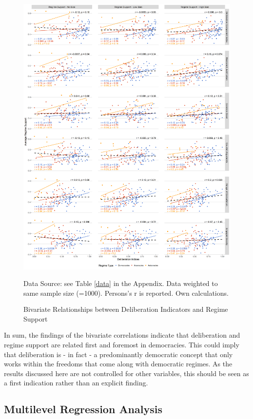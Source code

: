 \documentclass[]{article}
\begin{document}
\begin{figure}
        \caption{Bivariate Relationships between Deliberation Indicators and Regime Support}
        \label{sixs}
    \includegraphics[width=\textwidth]{images/megaplot.png}
        \flushright
        {\scriptsize Data Source: see Table \ref{data} in the Appendix. Data weighted to same sample size (=1000). Persons’s r is reported. Own calculations.  \par}
\end{figure}

In sum, the findings of the bivariate correlations indicate that
deliberation and regime support are related first and foremost in
democracies. This could imply that deliberation is - in fact - a
predominantly democratic concept that only works within the freedoms
that come along with democratic regimes. As the results discussed here
are not controlled for other variables, this should be seen as a first
indication rather than an explicit finding.

\subsection{Multilevel Regression Analysis} \label{multilevel_section}
\end{document}
